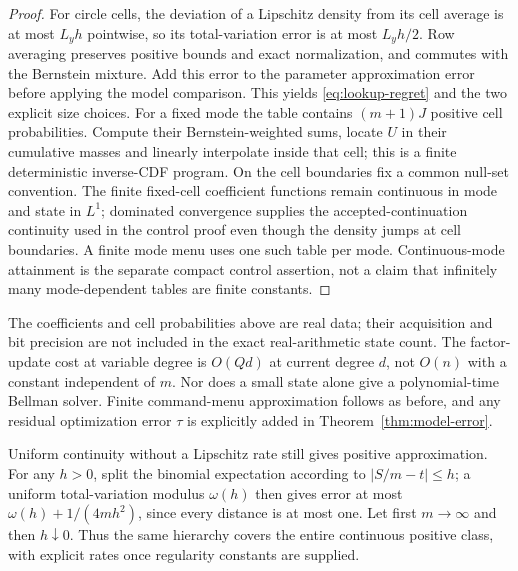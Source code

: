 \begin{proof}
For circle cells, the deviation of a Lipschitz density from its cell average is at most $L_yh$ pointwise, so its total-variation error is at most $L_yh/2$. Row averaging preserves positive bounds and exact normalization, and commutes with the Bernstein mixture. Add this error to the parameter approximation error before applying the model comparison. This yields \eqref{eq:lookup-regret} and the two explicit size choices. For a fixed mode the table contains $(m+1)J$ positive cell probabilities. Compute their Bernstein-weighted sums, locate $U$ in their cumulative masses and linearly interpolate inside that cell; this is a finite deterministic inverse-CDF program. On the cell boundaries fix a common null-set convention. The finite fixed-cell coefficient functions remain continuous in mode and state in $L^1$; dominated convergence supplies the accepted-continuation continuity used in the control proof even though the density jumps at cell boundaries. A finite mode menu uses one such table per mode. Continuous-mode attainment is the separate compact control assertion, not a claim that infinitely many mode-dependent tables are finite constants.
\end{proof}

The coefficients and cell probabilities above are real data; their acquisition and bit precision are not included in the exact real-arithmetic state count. The factor-update cost at variable degree is $O(Qd)$ at current degree $d$, not $O(n)$ with a constant independent of $m$. Nor does a small state alone give a polynomial-time Bellman solver. Finite command-menu approximation follows as before, and any residual optimization error $\tau$ is explicitly added in Theorem~\ref{thm:model-error}.

Uniform continuity without a Lipschitz rate still gives positive approximation. For any $h>0$, split the binomial expectation according to $|S/m-t|\le h$; a uniform total-variation modulus $\omega(h)$ then gives error at most $\omega(h)+1/(4mh^2)$, since every distance is at most one. Let first $m\to\infty$ and then $h\downarrow0$. Thus the same hierarchy covers the entire continuous positive class, with explicit rates once regularity constants are supplied.

